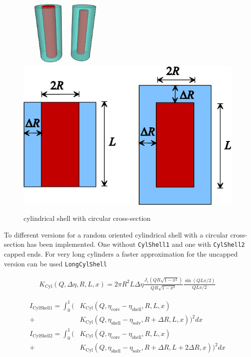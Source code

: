 \begin{figure}[htb]
\begin{center}
\includegraphics[width=0.4\textwidth,height=.293\textwidth]{../images/form_factor/cylindrical_obj/CylShell.png}
\hspace{0.1\textwidth}
\includegraphics[width=.4\textwidth,height=0.27\textwidth]{../images/form_factor/cylindrical_obj/cylshell2D.png}
\end{center}
\caption{cylindrical shell with circular cross-section}
\label{cylshell}
\end{figure}

To different versions for a random oriented cylindrical shell with a
circular cross-section has been implemented. One without  \texttt{CylShell1}
and one with \texttt{CylShell2} capped ends. For very long cylinders a faster
approximation for the uncapped version can be used \texttt{LongCylShell}

\begin{align}
K_\text{Cyl}(Q,\Delta\eta,R,L,x) =
2 \pi R^2 L \Delta \eta
    \frac{J_1\left(Q R \sqrt{1-x^2}\right)}{Q R \sqrt{1-x^2}}
    \frac{\sin(Q L x/2)}{QL x/2}
\end{align}

\begin{align}
I_\text{CylShell1} =
\int_0^1 \biggl(
  &
  K_\text{Cyl}\left(Q,\eta_\text{core}-\eta_\text{shell},R,L,x\right) \\
+&  K_\text{Cyl}\left(Q,\eta_\text{shell}-\eta_\text{solv},R+\Delta R,L,x\right)
\biggr)^2 dx \nonumber \\
I_\text{CylShell2} =
\int_0^1 \biggl(
 &  K_\text{Cyl}\left(Q,\eta_\text{core}-\eta_\text{shell},R,L,x\right) \\
+&  K_\text{Cyl}\left(Q,\eta_\text{shell}-\eta_\text{solv},R+\Delta R,L+2\Delta R,x\right)
\biggr)^2 dx \nonumber
\end{align}

